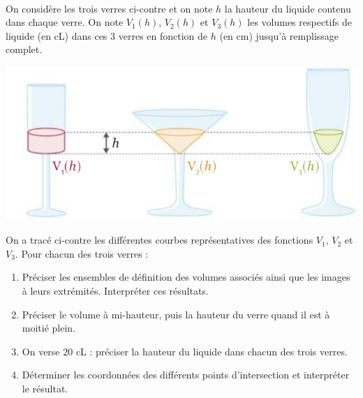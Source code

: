 \documentclass[11pt]{article}
\begin{document}
\begin{exo}~\\[-3mm]
\begin{minipage}{.5\textwidth}
  On considère les trois verres ci-contre et on note $h$ la hauteur du liquide
  contenu dans chaque verre. On note $V_1(h)$, $V_2(h)$ et $V_3(h)$ les volumes
  respectifs de liquide (en cL) dans ces $3$ verres en fonction de $h$ (en cm)
  jusqu'à remplissage complet.
\end{minipage}
\begin{minipage}{.5\textwidth}
  \begin{center}
\includegraphics[scale=.3]{verres.png}
  \end{center}
\end{minipage}
\begin{minipage}{.65\textwidth}
  On a tracé ci-contre les différentes courbes représentatives des fonctions
  $V_1$, $V_2$ et $V_3$. Pour chacun des trois verres :
  \begin{enumerate}
    \item Préciser les ensembles de définition des volumes associés ainsi que
      les images à leurs extrémités. Interpréter ces résultats.
    \item Préciser le volume à mi-hauteur, puis la hauteur du verre quand il est
      à moitié plein.
    \item On verse $20$ cL : préciser la hauteur du liquide dans chacun des
      trois verres.
    \item Déterminer les coordonnées des différents points d'intersection et
      interpréter le résultat.
  \end{enumerate}
\end{minipage}
\begin{minipage}{.35\textwidth}

\end{minipage}
\end{exo}
\end{document}
